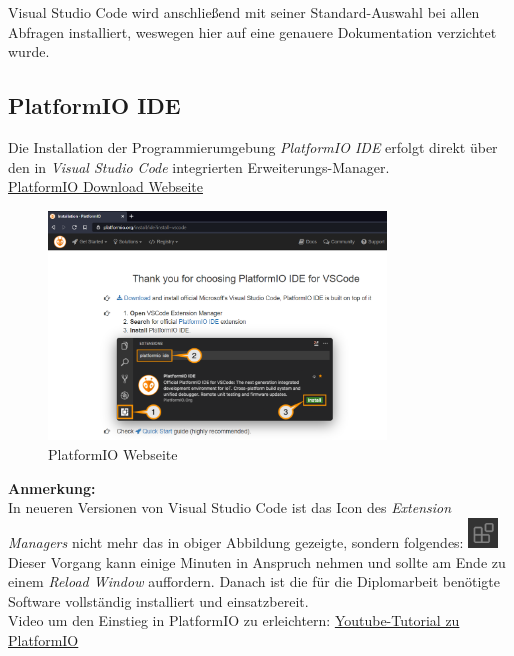 Visual Studio Code wird anschließend mit seiner Standard-Auswahl bei allen Abfragen installiert, weswegen hier auf eine genauere Dokumentation verzichtet wurde.

\newpage
\subsection{PlatformIO IDE}
Die Installation der Programmierumgebung \textit{PlatformIO IDE} erfolgt direkt über den in \textit{Visual Studio Code} integrierten Erweiterungs-Manager.\\
\href{https://platformio.org/install/ide?install=vscode}{PlatformIO Download Webseite}
\begin{figure}[h]
	\centering
	\includegraphics[width=0.8\textwidth]{bilder/Webseite_PlatformIO.png}
	\caption{PlatformIO Webseite}
\end{figure}

\textbf{Anmerkung:}\\
In neueren Versionen von Visual Studio Code ist das Icon des \textit{Extension Managers} nicht mehr das in obiger Abbildung gezeigte, sondern folgendes:
\includegraphics[align=t,width=0.8cm]{bilder/Icon_Extension_Manager.png}\\

Dieser Vorgang kann einige Minuten in Anspruch nehmen und sollte am Ende zu einem \textit{Reload Window} auffordern. Danach ist die für die Diplomarbeit benötigte Software vollständig installiert und einsatzbereit.\\

Video um den Einstieg in PlatformIO zu erleichtern: \href{https://youtu.be/JmvMvIphMnY?t=715}{Youtube-Tutorial zu PlatformIO}\\

\newpage
